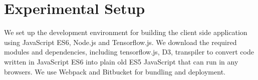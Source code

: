 \section{Experimental Setup}

We set up the development environment for building the client side application using JavaScript ES6, Node.js and Tensorflow.js. We download the required modules and dependencies, including tensorflow.js, D3, transpiler to convert code written in JavaScript ES6 into plain old ES5 JavaScript that can run in any browsers. We use Webpack and Bitbucket for bundling and deployment.

